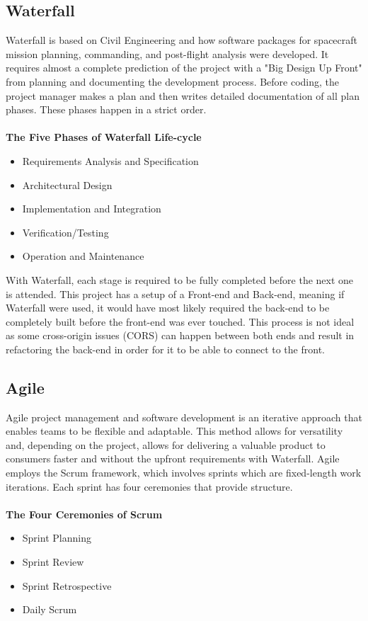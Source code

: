 \subsection{Waterfall}
Waterfall is based on Civil Engineering and how software packages for spacecraft mission planning, commanding, and post-flight analysis were developed. \cite{ref2} It requires almost a complete prediction of the project with a "Big Design Up Front" from planning and documenting the development process. Before coding, the project manager makes a plan and then writes detailed documentation of all plan phases. These phases happen in a strict order. \cite{ref3}
\\\\ \textbf{The Five Phases of Waterfall Life-cycle}
\begin{itemize}
    \item Requirements Analysis and Specification
    \item Architectural Design
    \item Implementation and Integration
    \item Verification/Testing
    \item Operation and Maintenance
\end{itemize}

With Waterfall, each stage is required to be fully completed before the next one is attended. This project has a setup of a Front-end and Back-end, meaning if Waterfall were used, it would have most likely required the back-end to be completely built before the front-end was ever touched. This process is not ideal as some cross-origin issues (CORS) can happen between both ends and result in refactoring the back-end in order for it to be able to connect to the front.

\subsection{Agile}
Agile project management and software development is an iterative approach that enables teams to be flexible and adaptable. This method allows for versatility and, depending on the project, allows for delivering a valuable product to consumers faster and without the upfront requirements with Waterfall. Agile employs the Scrum framework, which involves sprints which are fixed-length work iterations. Each sprint has four ceremonies that provide structure. \cite{ref3}
\\\\ \textbf{The Four Ceremonies of Scrum}
\begin{itemize}
    \item Sprint Planning
    \item Sprint Review
    \item Sprint Retrospective
    \item Daily Scrum
\end{itemize}

